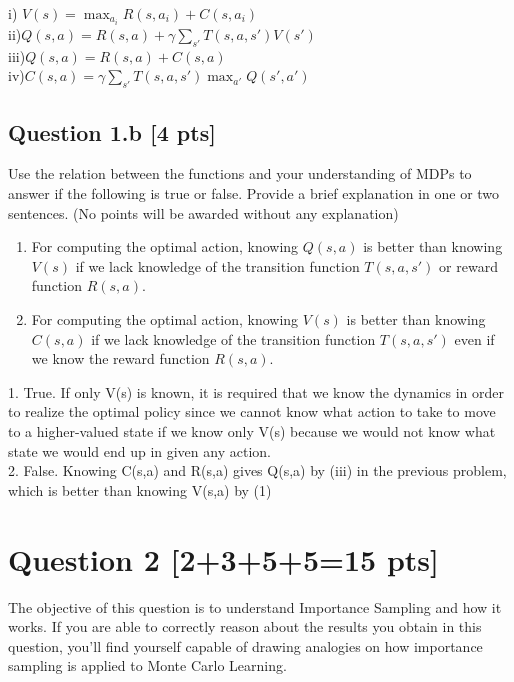 \documentclass[12pt]{article}
\begin{document}
\begin{solution}
i) $V(s) = \max_{a_{i}} R(s,a_{i}) + C(s,a_{i})$\\
ii)$Q(s,a) = R(s,a) + \gamma \sum_{s'} T(s,a,s')V(s')$ \\
iii)$Q(s,a) = R(s,a)  + C(s,a)$\\
iv)$C(s,a) = \gamma \sum_{s'} T(s,a,s')\max_{a'}Q(s',a')$
\end{solution}

\subsection*{Question 1.b \textbf{[4 pts]}}
Use the relation between the functions and your understanding of MDPs to answer if the following is true or false. Provide a brief explanation in one or two sentences. (No points will be awarded without any explanation)
\begin{enumerate}
    \item For computing the optimal action, knowing $Q(s,a)$ is better than knowing $V(s)$ if we lack knowledge of the transition function $T(s,a,s')$ or reward function $R(s,a)$.
    \item For computing the optimal action, knowing $V(s)$ is better than knowing $C(s,a)$ if we lack knowledge of the transition function $T(s,a,s')$ even if we know the reward function $R(s,a)$. 
\end{enumerate}

\begin{solution}
1. True.  If only V(s) is known, it is required that we know the dynamics in order to realize the optimal policy since we cannot know what action to take to move to a higher-valued state if we know only V(s) because we would not know what state we would end up in given any action.\\
2. False.  Knowing C(s,a) and R(s,a) gives Q(s,a) by (iii) in the previous problem, which is better than knowing V(s,a) by (1)
\end{solution}

\section*{Question 2 \textbf{[2+3+5+5=15 pts]}}
The objective of this question is to understand Importance Sampling and how it works. If you are able to correctly reason about the results you obtain in this question, you'll find yourself capable of drawing analogies on how importance sampling is applied to Monte Carlo Learning. \\
\end{document}
